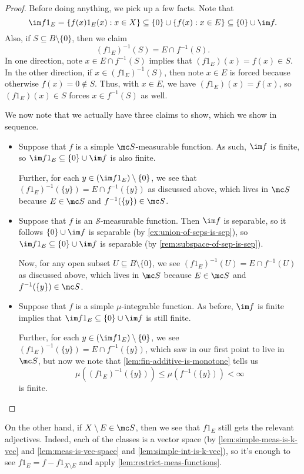 \documentclass[../notes.tex]{subfiles}
\begin{document}
\begin{proof}
	Before doing anything, we pick up a few facts. Note that
	\[\im f1_E=\{f(x)1_E(x):x\in X\}\subseteq\{0\}\cup\{f(x):x\in E\}\subseteq\{0\}\cup\im f.\]
	Also, if $S\subseteq B\setminus\{0\}$, then we claim
	\[(f1_E)^{-1}(S)=E\cap f^{-1}(S).\]
	In one direction, note $x\in E\cap f^{-1}(S)$ implies that $(f1_E)(x)=f(x)\in S$. In the other direction, if $x\in(f1_E)^{-1}(S)$, then note $x\in E$ is forced because otherwise $f(x)=0\notin S$. Thus, with $x\in E$, we have $(f1_E)(x)=f(x)$, so $(f1_E)(x)\in S$ forces $x\in f^{-1}(S)$ as well.

	We now note that we actually have three claims to show, which we show in sequence.
	\begin{itemize}
		\item Suppose that $f$ is a simple $\mc S$-measurable function. As such, $\im f$ is finite, so $\im f1_E\subseteq\{0\}\cup\im f$ is also finite.
		
		Further, for each $y\in(\im f1_E)\setminus\{0\}$, we see that $(f1_E)^{-1}(\{y\})=E\cap f^{-1}(\{y\})$ as discussed above, which lives in $\mc S$ because $E\in\mc S$ and $f^{-1}(\{y\})\in\mc S$.
		\item Suppose that $f$ is an $\mathcal S$-measurable function. Then $\im f$ is separable, so it follows $\{0\}\cup\im f$ is separable (by \autoref{ex:union-of-seps-is-sep}), so $\im f1_E\subseteq\{0\}\cup\im f$ is separable (by \autoref{rem:subspace-of-sep-is-sep}).

		Now, for any open subset $U\subseteq B\setminus\{0\}$, we see $(f1_E)^{-1}(U)=E\cap f^{-1}(U)$ as discussed above, which lives in $\mc S$ because $E\in\mc S$ and $f^{-1}(\{y\})\in\mc S$.
		\item Suppose that $f$ is a simple $\mu$-integrable function. As before, $\im f$ is finite implies that $\im f1_E\subseteq\{0\}\cup\im f$ is still finite.

		Further, for each $y\in(\im f1_E)\setminus\{0\}$, we see $(f1_E)^{-1}(\{y\})=E\cap f^{-1}(\{y\})$, which saw in our first point to live in $\mc S$, but now we note that \autoref{lem:fin-additive-is-monotone} tells us
		\[\mu\left((f1_E)^{-1}(\{y\})\right)\le\mu\left(f^{-1}(\{y\})\right)<\infty\]
		is finite.
		\qedhere
	\end{itemize}
\end{proof}
\begin{remark} \label{rem:complement-restrict-meas-functions}
	On the other hand, if $X\setminus E\in\mc S$, then we see that $f1_E$ still gets the relevant adjectives. Indeed, each of the classes is a vector space (by \autoref{lem:simple-meas-is-k-vec} and \autoref{lem:meas-is-vec-space} and \autoref{lem:simple-int-is-k-vec}), so it's enough to see $f1_E=f-f1_{X\setminus E}$ and apply \autoref{lem:restrict-meas-functions}.
\end{remark}
\end{document}
